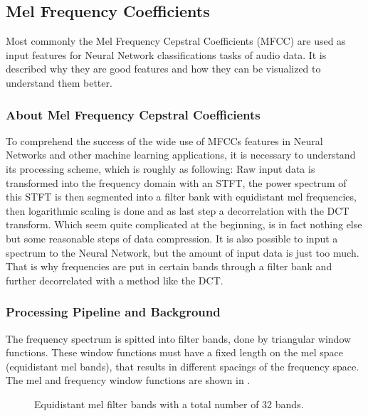 
\subsection{Mel Frequency Coefficients}\label{sec:t_mfcc}
Most commonly the Mel Frequency Cepstral Coefficients (MFCC) are used as input features for Neural Network classifications tasks of audio data.
It is described why they are good features and how they can be visualized to understand them better.

\subsubsection{About Mel Frequency Cepstral Coefficients}
To comprehend the success of the wide use of MFCCs features in Neural Networks and other machine learning applications, it is necessary to understand its processing scheme, which is roughly as following: 
Raw input data is transformed into the frequency domain with an STFT, the power spectrum of this STFT is then segmented into a filter bank with equidistant mel frequencies, then logarithmic scaling is done and as last step a decorrelation with the DCT transform.
Which seem quite complicated at the beginning, is in fact nothing else but some reasonable steps of data compression. 
It is also possible to input a spectrum to the Neural Network, but the amount of input data is just too much.
That is why frequencies are put in certain bands through a filter bank and further decorrelated with a method like the DCT.

\subsubsection{Processing Pipeline and Background}
The frequency spectrum is spitted into filter bands, done by triangular window functions.
These window functions must have a fixed length on the mel space (equidistant mel bands), that results in different spacings of
the frequency space. The mel and frequency window functions are shown in .
\begin{figure}[!ht]
  \centering
  \quad
  \caption{Equidistant mel filter bands with a total number of 32 bands.}
  \label{fig:filter_bands}
\end{figure}
\FloatBarrier
\noindent

